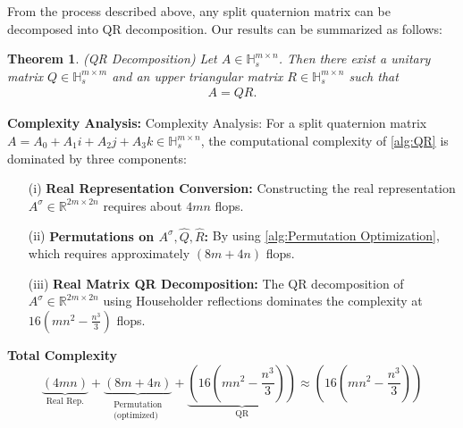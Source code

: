\documentclass[conference]{IEEEtran}
\newtheorem{theorem}{Theorem}[section]
\numberwithin{equation}{section}
\begin{document}
From the process described above, any split quaternion matrix can be decomposed into QR decomposition. Our results can be summarized as follows:
\begin{theorem}(QR Decomposition)
    Let $A \in \mathbb{H}_s^{m \times n}$. Then there exist a unitary matrix $Q \in \mathbb{H}_s^{m \times m}$ and an upper triangular matrix $R \in \mathbb{H}_s^{m \times n}$ such that
    \begin{eqnarray}\label{eq:split QR}
        A = Q R.
    \end{eqnarray}
\end{theorem}

\noindent \textbf{Complexity Analysis:}
{Complexity Analysis:} For a split quaternion matrix $A = A_0 + A_1i + A_2j + A_3k \in \mathbb{H}_s^{m \times n}$, the computational complexity of \cref{alg:QR} is dominated by three components:  

\begin{itemize}
\item[(i)] \textbf{Real Representation Conversion:}
Constructing the real representation $A^\sigma \in \mathbb{R}^{2m \times 2n}$ requires about $4mn$ flops. 

\item[(ii)] \textbf{Permutations on $A^\sigma, \widehat{Q}, \widehat{R}$:}
By using \cref{alg:Permutation Optimization},  which requires approximately  $(8m+4n)$ flops.

\item[(iii)] \textbf{Real Matrix QR Decomposition:}
The QR decomposition of $A^\sigma \in \mathbb{R}^{2m \times 2n}$ using Householder reflections dominates the complexity at $16(mn^2-\frac{n^3}{3})$ flops.
\end{itemize}

\noindent \textbf{Total Complexity}
$$
\underbrace{(4mn)}_{\text{Real Rep.}} + \underbrace{(8m+4n)}_{\substack{\text{Permutation} \\ \text{(optimized)}}} + \underbrace{(16(mn^2-\frac{n^3}{3}))}_{\text{QR}} \approx \boxed{(16(mn^2-\frac{n^3}{3}))}
$$  
\end{document}

